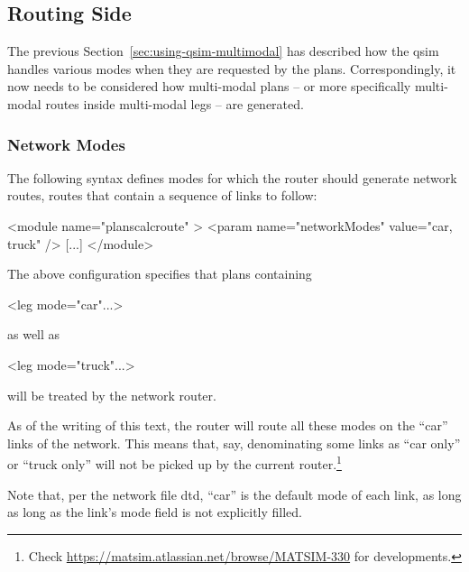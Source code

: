 \subsection{Routing Side}
\label{sec:using-routing-multimodal}

The previous Section~\ref{sec:using-qsim-multimodal} has described how the \gls{qsim} handles various modes when they are requested by the plans.
%
Correspondingly, it now needs to be considered how multi-modal plans -- or more specifically multi-modal routes inside multi-modal legs -- are generated.

\subsubsection{Network Modes}
\label{sec:network-modes}
The following syntax defines modes for which the router should generate network routes, \ie routes that contain a sequence of links to follow:
\begin{xml}
<module name="planscalcroute" >
   <param name="networkModes" value="car, truck" />
   [...]
</module>
\end{xml}
The above configuration specifies that plans containing
\begin{xml}
<leg mode="car"...>
\end{xml}
as well as
\begin{xml}
<leg mode="truck"...>
\end{xml}
will be treated by the network router.

As of the writing of this text, the router will route all these modes 
on the ``car'' links of the network.  This means that, say, denominating some links as ``car only'' or ``truck only'' will not be picked up by the current router.\footnote{%
%
Check \url{https://matsim.atlassian.net/browse/MATSIM-330} for developments.
%
}

Note that, per the network file \gls{dtd}, ``car'' is the default mode of each link, as long as long as the link's mode field is not explicitly filled. 


